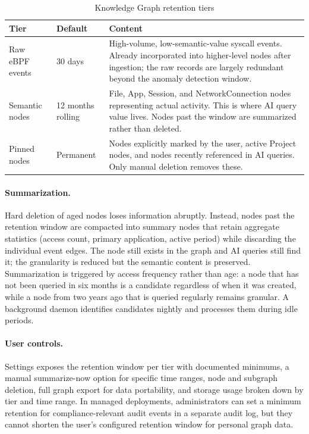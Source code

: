 \begin{table}[htbp]
\caption{Knowledge Graph retention tiers}
\label{tab:retention}
\begin{tabularx}{\linewidth}{llX}
\toprule
\textbf{Tier} & \textbf{Default} & \textbf{Content} \\
\midrule
Raw eBPF events &
  30 days &
  High-volume, low-semantic-value syscall events. Already incorporated
  into higher-level nodes after ingestion; the raw records are largely
  redundant beyond the anomaly detection window. \\
Semantic nodes &
  12 months rolling &
  File, App, Session, and NetworkConnection nodes representing actual
  activity. This is where AI query value lives. Nodes past the window
  are summarized rather than deleted. \\
Pinned nodes &
  Permanent &
  Nodes explicitly marked by the user, active Project nodes, and nodes
  recently referenced in AI queries. Only manual deletion removes these. \\
\bottomrule
\end{tabularx}
\end{table}

\paragraph{Summarization.}
Hard deletion of aged nodes loses information abruptly. Instead, nodes past
the retention window are compacted into summary nodes that retain aggregate
statistics (access count, primary application, active period) while discarding
the individual event edges. The node still exists in the graph and AI queries
still find it; the granularity is reduced but the semantic content is
preserved. Summarization is triggered by access frequency rather than age: a
node that has not been queried in six months is a candidate regardless of when
it was created, while a node from two years ago that is queried regularly
remains granular. A background daemon identifies candidates nightly and
processes them during idle periods.

\paragraph{User controls.}
Settings exposes the retention window per tier with documented minimums, a
manual summarize-now option for specific time ranges, node and subgraph
deletion, full graph export for data portability, and storage usage broken down
by tier and time range. In managed deployments, administrators can set a
minimum retention for compliance-relevant audit events in a separate audit log,
but they cannot shorten the user's configured retention window for personal
graph data.
